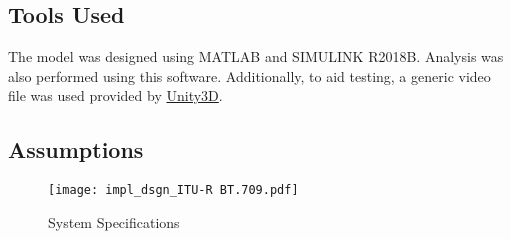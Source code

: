 \subsection{Tools Used}
The model was designed using MATLAB\textsuperscript{\tiny\textregistered} and SIMULINK\textsuperscript{\tiny\textregistered} R2018B. Analysis was also performed using this software. Additionally, to aid testing, a generic video file was used provided by \hyperlink{https://blogs.unity3d.com/2016/11/28/free-vfx-image-sequences-flipbooks/}{Unity3D}.
\subsection{Assumptions}

\begin{figure}[H]
   \texttt{[image: impl\_dsgn\_ITU-R BT.709.pdf]}
   \caption{System Specifications}\label{fig:sysSpecs}
\end{figure}